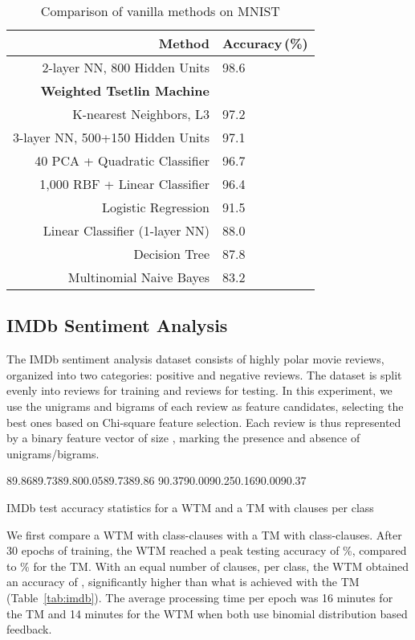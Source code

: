 \documentclass[letterpaper]{article}
\begin{document}
\begin{table}[!ht]
\centering
\begin{tabular}{rl}
\toprule
\bfseries Method&\bfseries Accuracy\,(\%)\!\!\!\\
\midrule[\heavyrulewidth]
2-layer NN, 800 Hidden Units&98.6\\
\bfseries Weighted Tsetlin Machine&\boldmath\\
K-nearest Neighbors, L3&97.2\\
3-layer NN, 500+150 Hidden Units&97.1\\
40 PCA + Quadratic Classifier&96.7\\
1,000 RBF + Linear Classifier&96.4\\
Logistic Regression&91.5\\
Linear Classifier (1-layer NN)&88.0\\
Decision Tree&87.8\\
Multinomial Naive Bayes&83.2\\
\bottomrule
\end{tabular}
\caption{Comparison of vanilla methods on MNIST}
\label{tab:comp}
\end{table}

\subsection{IMDb Sentiment Analysis}
The IMDb sentiment analysis dataset consists of  highly polar movie reviews, organized into two categories: positive and negative reviews. The dataset is split evenly into  reviews for training and  reviews for testing. In this experiment, we use the unigrams and bigrams of each review as feature candidates, selecting the best  ones based on Chi-square feature selection. Each review is thus represented by a binary feature vector of size , marking the presence and absence of unigrams/bigrams.

\begin{table}[!ht]
\centering
\tableit
{89.86}{89.73}{89.80}{0.05}{89.73}{89.86}
{90.37}{90.00}{90.25}{0.16}{90.00}{90.37}
\caption{IMDb test accuracy statistics for a WTM and a TM with  clauses per class}
\label{tab:imdb}
\end{table}

We first compare a WTM with  class-clauses with a TM with  class-clauses. After 30 epochs of training, the WTM reached a peak testing accuracy of \%, compared to \% for the TM.
With an equal number of clauses,  per class, the WTM obtained an accuracy of , significantly higher than what is achieved with the TM (Table~\ref{tab:imdb}). The average processing time per epoch was 16 minutes for the TM and 14 minutes for the WTM when both use binomial distribution based feedback.
\end{document}
